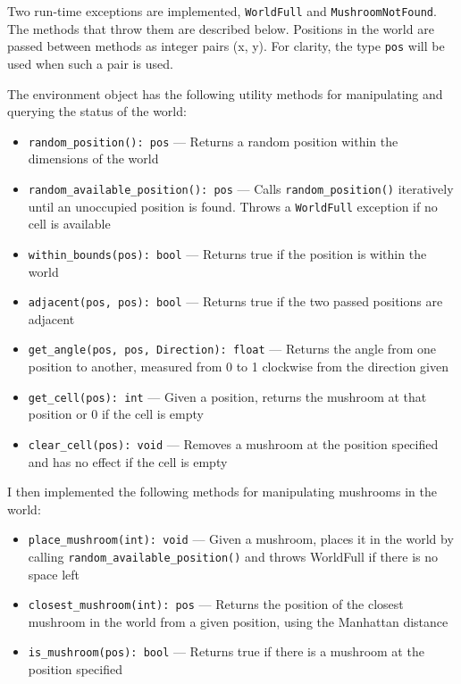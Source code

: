 \documentclass[12pt,a4paper,twoside,openright]{report}
\begin{document}
Two run-time exceptions are implemented, \texttt{WorldFull} and \texttt{MushroomNotFound}. The methods that throw them are described below. Positions in the world are passed between methods as integer pairs (x, y). For clarity, the type \texttt{pos} will be used when such a pair is used.

The environment object has the following utility methods for manipulating and querying the status of the world:

\begin{itemize}
	\item \texttt{random\_position(): pos} --- Returns a random position within the dimensions of the world
	\item \texttt{random\_available\_position(): pos} --- Calls \texttt{random\_position()} iteratively until an unoccupied position is found. Throws a \texttt{WorldFull} exception if no cell is available
	\item \texttt{within\_bounds(pos): bool} --- Returns true if the position is within the world
	\item \texttt{adjacent(pos, pos): bool} --- Returns true if the two passed positions are adjacent
	\item \texttt{get\_angle(pos, pos, Direction): float} --- Returns the angle from one position to another, measured from 0 to 1 clockwise from the direction given
	\item \texttt{get\_cell(pos): int} --- Given a position, returns the mushroom at that position or 0 if the cell is empty
	\item \texttt{clear\_cell(pos): void} --- Removes a mushroom at the position specified and has no effect if the cell is empty
\end{itemize}

I then implemented the following methods for manipulating mushrooms in the world:

\begin{itemize}
	\item \texttt{place\_mushroom(int): void} --- Given a mushroom, places it in the world by calling \texttt{random\_available\_position()} and throws WorldFull if there is no space left
	\item \texttt{closest\_mushroom(int): pos} --- Returns the position of the closest mushroom in the world from a given position, using the Manhattan distance
	\item \texttt{is\_mushroom(pos): bool} --- Returns true if there is a mushroom at the position specified
\end{itemize}
\end{document}
